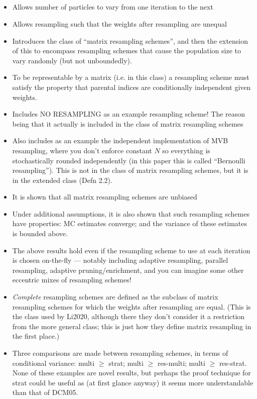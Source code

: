 \documentclass{article}
\begin{document}
\subsection*{\cite{webber2019}}
\begin{itemize}
\item Allows number of particles to vary from one iteration to the next
\item Allows resampling such that the weights after resampling are unequal
\item Introduces the class of ``matrix resampling schemes'', and then the extension of this to encompass resampling schemes that cause the population size to vary randomly (but not unboundedly). 
\item To be representable by a matrix (i.e. in this class) a resampling scheme must satisfy the property that parental indices are conditionally independent given weights.
\item Includes NO RESAMPLING as an example resampling scheme! The reason being that it actually is included in the class of matrix resampling schemes
\item Also includes as an example the independent implementation of MVB resampling, where you don't enforce constant $N$ so everything is stochastically rounded independently (in this paper this is called ``Bernoulli resampling''). This is not in the class of matrix resampling schemes, but it is in the extended class (Defn 2.2).
\item It is shown that all matrix resampling schemes are unbiased
\item Under additional assumptions, it is also shown that such resampling schemes have properties: MC estimates converge; and the variance of these estimates is bounded above.
\item The above results hold even if the resampling scheme to use at each iteration is chosen on-the-fly --- notably including adaptive resampling, parallel resampling, adaptive pruning/enrichment, and you can imagine some other eccentric mixes of resampling schemes!
\item \emph{Complete} resampling schemes are defined as the subclass of matrix resampling schemes for which the weights after resampling are equal. (This is the class used by Li2020, although there they don't consider it a restriction from the more general class; this is just how they define matrix resampling in the first place.)
\item Three comparisons are made between resampling schemes, in terms of conditional variance: multi $\geq$ strat; multi $\geq$ res-multi; multi $\geq$ res-strat. None of these examples are novel results, but perhaps the proof technique for strat could be useful as (at first glance anyway) it seems more understandable than that of DCM05.

\end{itemize}
\end{document}
